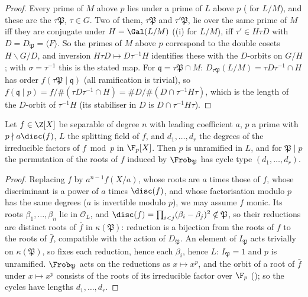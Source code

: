 \begin{proof}
Every prime of $M$ above $p$ lies under a prime of $L$ above $p$ ( for $L/M$), and these are the $\tau\mathfrak P$, $\tau\in G$. Two of
them, $\tau\mathfrak P$ and $\tau'\mathfrak P$, lie over the same prime of $M$ iff they are conjugate under $H=\Gal(L/M)$
((i) for $L/M$), iff $\tau'\in H\tau D$ with $D=D_{\mathfrak P}=\langle F\rangle$. So the primes of $M$ above $p$ correspond to the
double cosets $H\backslash G/D$, and inversion $H\tau D\mapsto D\tau^{-1}H$ identifies these with the $D$-orbits on $G/H$; with $\sigma=\tau^{-1}$ this is the
stated map. For $\mathfrak q=\tau\mathfrak P\cap M$: $D_{\tau\mathfrak P}(L/M)=\tau D\tau^{-1}\cap H$ has order $f(\tau\mathfrak P\mid\mathfrak q)$ (all ramification is
trivial), so $f(\mathfrak q\mid p)=f/\#(\tau D\tau^{-1}\cap H)=\#D/\#(D\cap\tau^{-1}H\tau)$, which is the length of the $D$-orbit of $\tau^{-1}H$ (its stabiliser in
$D$ is $D\cap\tau^{-1}H\tau$).
\end{proof}

\begin{corollary}\label{cor:ant:cycletype}
Let $f\in\Z[X]$ be separable of degree $n$ with leading coefficient $a$, $p$ a prime with $p\nmid a\disc(f)$, $L$ the splitting field of $f$, and
$d_1,\dots,d_r$ the degrees of the irreducible factors of $f\bmod p$ in $\F_p[X]$. Then $p$ is unramified in $L$, and for $\mathfrak P\mid p$ the
permutation of the roots of $f$ induced by $\Frob_{\mathfrak P}$ has cycle type $(d_1,\dots,d_r)$.
\end{corollary}

\begin{proof}
Replacing $f$ by $a^{n-1}f(X/a)$, whose roots are $a$ times those of $f$, whose discriminant is a power of $a$ times $\disc(f)$, and whose
factorisation modulo $p$ has the same degrees ($a$ is invertible modulo $p$), we may assume $f$ monic. Its roots $\beta_1,\dots,\beta_n$ lie in $\mathcal O_L$,
and $\disc(f)=\prod_{i<j}(\beta_i-\beta_j)^2\notin\mathfrak P$, so their reductions are distinct roots of $\bar f$ in $\kappa(\mathfrak P)$: reduction is a
bijection from the roots of $f$ to the roots of $\bar f$, compatible with the action of $D_{\mathfrak P}$. An element of $I_{\mathfrak P}$ acts trivially on
$\kappa(\mathfrak P)$, so fixes each reduction, hence each $\beta_i$, hence $L$: $I_{\mathfrak P}=1$ and $p$ is unramified. $\Frob_{\mathfrak P}$ acts on the
reductions as $x\mapsto x^p$, and the orbit of a root of $\bar f$ under $x\mapsto x^p$ consists of the roots of its irreducible factor over $\F_p$
(); so the cycles have lengths $d_1,\dots,d_r$.
\end{proof}

